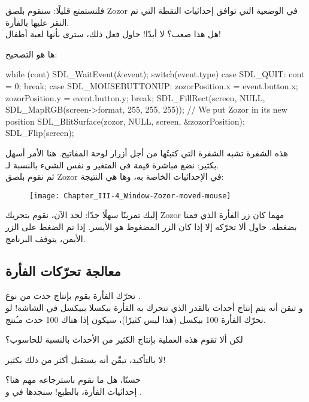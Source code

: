 فلنستمتع قليلًا: سنقوم بلصق 
\textenglish{Zozor}
في الوضعية التي توافق إحداثيات النقطة التي تم النقر عليها بالفأرة.\\
هل هذا صعب؟ لا أبدًا! حاول فعل ذلك، سترى بأنها لعبة أطفال!

ها هو التصحيح:

\begin{Csource}
while (cont)
{
	SDL_WaitEvent(&event);
	switch(event.type)
	{
		case SDL_QUIT:
		cont = 0;
		break;
		case SDL_MOUSEBUTTONUP:
		zozorPosition.x = event.button.x;
		zozorPosition.y = event.button.y;
		break;
	}
	SDL_FillRect(screen, NULL, SDL_MapRGB(screen->format, 255, 255, 255));
	// We put Zozor in its new position
	SDL_BlitSurface(zozor, NULL, screen, &zozorPosition); 
	SDL_Flip(screen);
}
\end{Csource}

هذه الشفرة تشبه الشفرة التي كتبتُها من أجل أزرار لوحة المفاتيح. هنا الأمر أسهل بكثير: نضع مباشرة قيمة 
في المتغير  
و نفس الشيء بالنسبة لـ.\\
ثم نقوم بلصق
\textenglish{Zozor}
في الإحداثيات الخاصة به، وها هي النتيجة:

\begin{figure}[H]
	\centering
	\texttt{[image: Chapter\_III-4\_Window-Zozor-moved-mouse]}
\end{figure}

إليك تمرينًا سهلًا جدًا: لحد الآن، نقوم بتحريك
\textenglish{Zozor}
مهما كان زر الفأرة الذي قمنا بضغطه. حاول ألا تحرّكه إلا إذا كان الزر المضغوط هو الأيسر. إذا تم الضغط على الزر الأيمن، يتوقف البرنامج.

\subsection{معالجة تحرّكات الفأرة}

تحرّك الفأرة يقوم بإنتاج حدث من نوع
.\\
و تيقن أنه يتم إنتاج أحداث بالقدر الذي تتحرك به الفأرة بيكسلا ببيكسل في الشاشة! لو نحرّك الفأرة 100 بيكسل (هذا ليس كثيرًا)، سيكون إذا هناك 100 حدث مـُنتج.

\begin{question}
لكن ألا تقوم هذه العملية بإنتاج الكثير من الأحداث بالنسبة للحاسوب؟
\end{question}

لا بالتأكيد، تيقّن أنه يستقبل أكثر من ذلك بكثير!

حسنًا، هل ما نقوم باسترجاعه مهم هنا؟\\
إحداثيات الفأرة، بالطبع! سنجدها في
و
.

